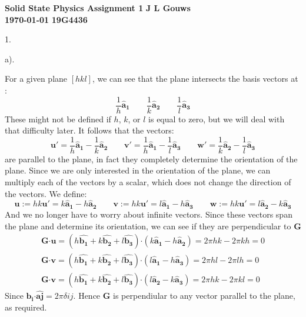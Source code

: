\documentclass[a4paper,12pt]{article}
\newcommand{\defeq}{:=}
\newcommand\block[1]{\hspace*{#1}}
\newcommand{\af}{\pmb{\hat a_1}}
\newcommand{\as}{\pmb{\hat a_2}}
\newcommand{\at}{\pmb{\hat a_3}}
\newcommand\uv[1]{\pmb{\hat {#1}}}
\newcommand\vect[1]{\pmb{{#1}}}
\newcommand\dprod{\pmb{\cdot}}
\begin{document}
\selectfont
{\Large \textbf{Solid State Physics Assignment 1}} \hfill {\Large \textbf{J L Gouws}}\\
\block{1.0cm} {\large \textbf{\today}} \hfill {\large \textbf{19G4436}}\\
\thispagestyle{empty}

1.
\begin{minipage}[t]{0.9\textwidth}
  a).
  \begin{minipage}[t]{\textwidth}
    For a given plane $[hkl]$, we can see that the plane intersects the basis vectors at \footnotemark:\\
    \begin{equation*}
      \frac{1}{h} \af \qquad \frac{1}{k} \as \qquad \frac{1}{l} \at
    \end{equation*}
    These might not be defined if $h$, $k$, or $l$ is equal to zero, but we will deal with that difficulty later.
    It follows that the vectors:
    \begin{equation*}
      \vect{ u'} = \frac{1}{h} \af - \frac{1}{k} \as \qquad \vect{v'} = \frac{1}{h} \af - \frac{1}{l} \at \qquad  \vect{w'} = \frac{1}{k} \as - \frac{1}{l} \at
    \end{equation*}
    are parallel to the plane, in fact they completely determine the orientation of the plane.
    Since we are only interested in the orientation of the plane, we can multiply each of the vectors by a scalar, which does not change the direction of the vectors.
    We define:
    \begin{equation*}
      \vect{u} \defeq hk \vect{u'} = k \af - h \as \qquad \vect{v} \defeq hk \vect{u'}= l \af - h \at \qquad  \vect{w} \defeq hk \vect{u'} = l \as - k \at
    \end{equation*}
    And we no longer have to worry about infinite vectors.
    Since these vectors span the plane and determine its orientation, we can see if they are perpendicular to $\pmb{G}$
    \begin{gather*}
      \pmb{G} \dprod \pmb{u} = (h \uv{b_1} + k \uv{b_2} + l \uv{b_3})\dprod (k \af - h \as)
                             = 2 \pi hk - 2 \pi kh
                             = 0\\
      \pmb{G} \dprod \pmb{v} = (h \uv{b_1} + k \uv{b_2} + l \uv{b_3})\dprod (l \af - h \at)
                             = 2 \pi hl - 2 \pi lh
                             = 0\\
      \pmb{G} \dprod \pmb{v} = (h \uv{b_1} + k \uv{b_2} + l \uv{b_3})\dprod (l \as - k \at)
                             = 2 \pi hk - 2 \pi kl
                             = 0
    \end{gather*}
    Since $\uv{b_i} \dprod \uv{aj} = 2 \pi \delta{ij}$.
    Hence $\pmb{G}$ is perpendiular to any vector parallel to the plane, as required.\\
  \end{minipage}


\end{minipage}
\end{document}
